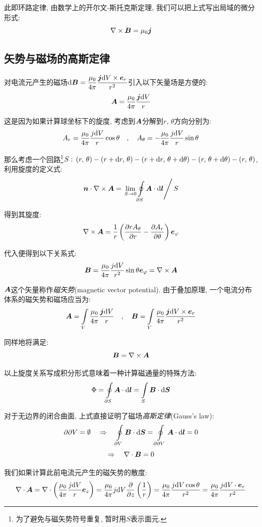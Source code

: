 此即环路定律, 由数学上的开尔文-斯托克斯定理, 我们可以把上式写出局域的微分形式:
\[\nabla\times \boldsymbol{B}=\mu_0 \boldsymbol{j}\]


\subsection{矢势与磁场的高斯定律}

对电流元产生的磁场$\textrm{d} \boldsymbol{B}=\dfrac{\mu_0}{4\pi}\dfrac{\boldsymbol{j}\textrm{d} V\times \boldsymbol{e}_r}{ r^2}$引入以下矢量场是方便的:
\[\boldsymbol{A}=\frac{\mu_0}{4\pi}\frac{\boldsymbol{j}\textrm{d} V}{r}\]

这是因为如果计算球坐标下的旋度, 考虑到$\boldsymbol{A}$分解到$r,\,\theta$方向分别为:
\[A_r=\frac{\mu_0}{4\pi}\frac{j\textrm{d} V}{r}\cos\theta\quad ,\quad A_\theta=-\frac{\mu_0}{4\pi}\frac{j\textrm{d} V}{r}\sin\theta\]

那么考虑一个回路\footnote{为了避免与磁矢势符号重复, 暂时用$S$表示面元.}$S:\,(r,\,\theta)-(r+\textrm{d} r,\,\theta)-(r+\textrm{d} r,\,\theta+\textrm{d} \theta)-(r,\,\theta+\textrm{d} \theta)-(r,\,\theta)$, 利用旋度的定义式:
\[\boldsymbol{n}\cdot\nabla\times \boldsymbol{A}=\left.\lim_{S\to 0}\oint\limits_{\partial S}\boldsymbol{A}\cdot \textrm{d} \boldsymbol{l}\right/S\]

得到其旋度:
\[\nabla\times \boldsymbol{A}=\frac{1}{r}\left(\frac{\partial rA_\theta}{\partial r}-\frac{\partial A_r}{\partial \theta}\right)\boldsymbol{e}_\varphi\]

代入便得到以下关系式:
\[\boldsymbol{B}=\frac{\mu_0}{4\pi}\frac{j\textrm{d} V}{r^2}\sin\theta\boldsymbol{e}_\varphi=\nabla\times \boldsymbol{A}\]

$\boldsymbol{A}$这个矢量称作\emph{磁矢势}(magnetic vector potential). 由于叠加原理, 一个电流分布体系的磁矢势和磁场应当为:
\[\boldsymbol{A}=\int\limits_V \frac{\mu_0}{4\pi}\frac{\boldsymbol{j}\textrm{d} V}{r}\quad ,\quad \boldsymbol{B}=\int\limits_V \frac{\mu_0}{4\pi}\frac{\boldsymbol{j}\textrm{d} V\times \boldsymbol{e}_r}{r^2}\]

同样地将满足:
\[\boldsymbol{B}=\nabla\times \boldsymbol{A}\]

以上旋度关系写成积分形式意味着一种计算磁通量的特殊方法:
\[\Phi=\oint\limits_{\partial S} \boldsymbol{A}\cdot \textrm{d} \boldsymbol{l}=\int\limits_S\boldsymbol{B}\cdot \textrm{d} \boldsymbol{S}\]


对于无边界的闭合曲面, 上式直接证明了磁场\emph{高斯定律}(Gauss's law):
\[\partial\partial V=\emptyset\quad\Rightarrow\quad \oint\limits_{\partial V}\boldsymbol{B}\cdot \textrm{d} \boldsymbol{S}=\oint\limits_{\partial\partial V} \boldsymbol{A}\cdot \textrm{d} \boldsymbol{l}=0\]
\[\Rightarrow\quad  \nabla\cdot \boldsymbol{B}=0\]

我们如果计算此前电流元产生的磁矢势的散度:
\[\nabla\cdot\boldsymbol{A}=\nabla\cdot\left(\frac{\mu_0}{4\pi}\frac{j\textrm{d} V}{r}\boldsymbol{e}_z\right)=\frac{\mu_0}{4\pi}j\textrm{d} V\frac{\partial}{\partial z}\left(\frac{1}{r}\right)=\frac{\mu_0}{4\pi}\frac{j\textrm{d} V\cos\theta}{r^2}=\frac{\mu_0}{4\pi}\frac{j\textrm{d} V\cdot \boldsymbol{e}_r}{r^2}\]

